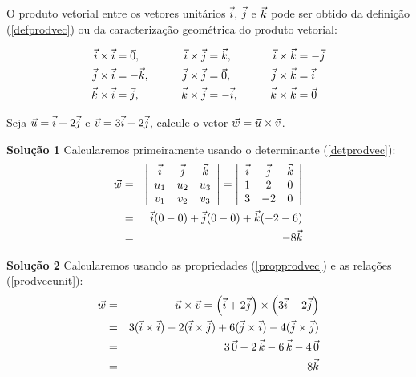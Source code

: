 O produto vetorial entre os vetores unitários $\vec{i}$, $\vec{j}$ e $\vec{k}$ pode ser obtido da definição (\ref{defprodvec}) ou da caracterização geométrica do produto vetorial:

\begin{align}\label{prodvecunit}
\vec{i}\times \vec{i}&=\vec{0},\qquad & \vec{i}\times \vec{j}&=\vec{k},\qquad &\vec{i}\times \vec{k}&=-\vec{j}\nonumber\\
\vec{j}\times \vec{i}&=-\vec{k},\qquad & \vec{j}\times \vec{j}&=\vec{0},\qquad& \vec{j}\times \vec{k}&=\vec{i}\nonumber\\
\vec{k}\times \vec{i}&=\vec{j},\qquad &\vec{k}\times \vec{j}&=-\vec{i},\qquad &\vec{k}\times \vec{k}&=\vec{0}
\end{align}

\begin{exer} Seja $\vec{u}=\vec{i}+2\vec{j}$ e $\vec{v}=3\vec{i}-2\vec{j}$, calcule o vetor $\vec{w}=\vec{u}\times\vec{v}$.
\end{exer}
{\bf Solução 1} Calcularemos primeiramente usando o determinante (\ref{detprodvec}):
\begin{eqnarray*}\vec{w}&=&\left|\begin{array}{ccc}
\vec{i}&\vec{j}&\vec{k}\\
u_1 & u_2 & u_3\\
v_1 & v_2 & v_3\\
\end{array}
\right|=\left|\begin{array}{ccc}
\vec{i}&\vec{j}&\vec{k}\\
1 & 2 & 0\\
3 & -2& 0\\
\end{array} \right|\\
&=&\vec{i}(0-0)+\vec{j}(0-0)+\vec{k}(-2-6)\\
&=&-8\vec{k}
\end{eqnarray*}

{\bf Solução 2} Calcularemos usando as propriedades (\ref{propprodvec}) e as relações (\ref{prodvecunit}):
\begin{eqnarray*}\vec{w}&=&\vec{u}\times\vec{v}= \left(\vec{i}+2\vec{j}\right)\times\left(3\vec{i}-2\vec{j}\right)\\
&=&3(\vec{i}\times\vec{i})-2(\vec{i}\times\vec{j})+6(\vec{j}\times\vec{i})-4(\vec{j}\times\vec{j})\\
&=&3~\!\vec{0}-2~\!\vec{k}-6~\!\vec{k}-4~\!\vec{0}\\
&=&-8\vec{k}
\end{eqnarray*}



